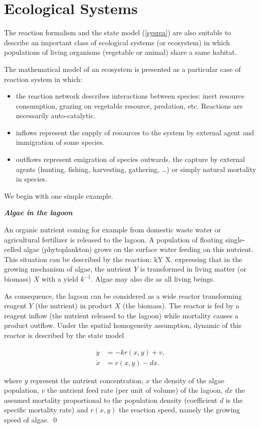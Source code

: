 \section{Ecological Systems} 

The reaction formalism and the state model (\ref{sysrea}) are also suitable to describe an important class of ecological systems (or ecosystem) in which populations of living organisms (vegetable or animal) share a same habitat.

The mathematical model of an ecosystem is presented as a particular case of reaction system in which:

\begin{itemize}
\item the reaction network describes interactions between species:
 inert resource consumption, grazing on vegetable resource, predation, etc.
 Reactions are necessarily  auto-catalytic.
\item inflows represent the supply of resources to the system by external agent and immigration of some species.
\item outflows represent emigration of species outwards, the capture by external agents (hunting, fishing, harvesting, gathering, \dots) or simply natural mortality in species. 
\end{itemize}

We begin with one simple example.

\begin{exemple}{\bf \em  Algae in the lagoon}

An organic nutrient coming for example from domestic waste water or agricultural fertilizer is released to the lagoon. 
A population of floating single-celled algae (phytoplankton) grows on the surface water feeding on this nutrient. 
This situation can be described  by the reaction:
\eqn
kY \longrightarrow X. \label{reacrois}
\eeqn
expressing that in the growing mechanism of algae, the nutrient $Y$ is transformed in living matter (or biomass) $X$ with a yield $k^{-1}$.
Algae may also die as all living beings.

As consequence, the lagoon can be considered as a wide reactor transforming reagent $Y$ (the nutrient) in product $X$ (the biomass). The reactor is fed by a reagent inflow (the nutrient released to the lagoon) while mortality causes a product outflow. Under the spatial homogeneity assumption, dynamic of this reactor is described by the state model

\begin{equation} \begin{split} \label{lagune}
\dot y &= -kr(x,y) + v, \\
\dot x &= r(x,y) - dx.
\end{split} \end{equation}

where $y$ represent the nutrient concentration, $x$ the density of the algae population, $v$ the nutrient feed rate (per unit of volume) of the lagoon, $dx$ the assumed mortality proportional to the population density (coefficient $d$ is the specific mortality rate) and $r(x,y)$ the reaction speed, namely the growing speed of algae. \qed
\end{exemple}

